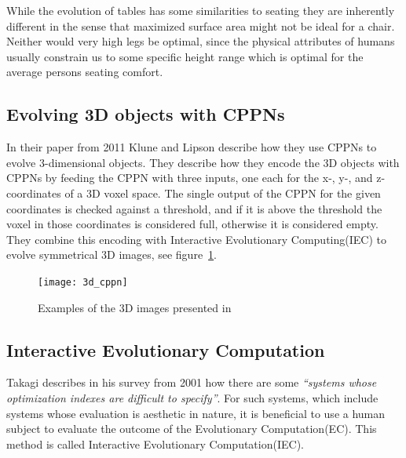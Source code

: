 While the evolution of tables has some similarities to seating they are inherently
different in the sense that maximized surface area might not be ideal for a
chair.
Neither would very high legs be optimal, since the physical attributes of humans
usually constrain us to some specific height range which is optimal for the
average persons seating comfort.

\subsection{Evolving 3D objects with CPPNs}
In their paper from 2011 Klune and Lipson describe how they use CPPNs to evolve 3-dimensional objects\cite{Clune:2011:EOG:2078245.2078246}.
They describe how they encode the 3D objects with CPPNs by feeding the CPPN with three inputs, one each for the x-, y-, and z- coordinates of a 3D voxel space.
The single output of the CPPN for the given coordinates is checked against a threshold, and if it is above the threshold the voxel in those coordinates is considered full, otherwise it is considered empty\cite[p.~5]{Clune:2011:EOG:2078245.2078246}.
They combine this encoding with Interactive Evolutionary Computing(IEC) to evolve symmetrical 3D images, see figure~\ref{fig:3dobjects}.
\begin{figure}[ht]
\centering
\texttt{[image: 3d\_cppn]}
\caption{Examples of the 3D images presented in \cite{Clune:2011:EOG:2078245.2078246}}
\label{fig:3dobjects}
\end{figure}

\subsection{Interactive Evolutionary Computation}
Takagi describes in his survey from 2001\cite{Takagi2001} how there are some \emph{``systems whose optimization indexes are difficult to specify''}\cite[p.~1275]{Takagi2001}.
For such systems, which include systems whose evaluation is aesthetic in nature, it is beneficial to use a human subject to evaluate the outcome of the Evolutionary Computation(EC).
This method is called Interactive Evolutionary Computation(IEC).



